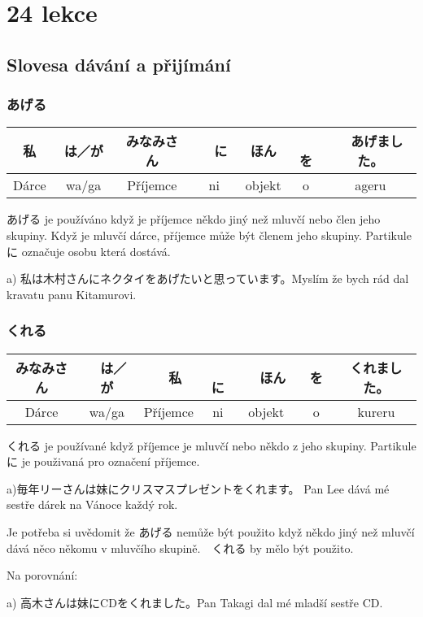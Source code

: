 \section{24 lekce}

\subsection{Slovesa dávání a přijímání}


\subsubsection{あげる}
\begin{tabular}{||c|c||c|c||c|c||c||}
\hline
私　&は／が　&みなみさん&　に　&ほん&　を&　あげました。\\
\hline
Dárce&wa/ga&Příjemce&ni&objekt&o&ageru\\
\hline
\end{tabular}


あげる je používáno když je příjemce někdo jiný než mluvčí nebo člen jeho skupiny. Když je mluvčí dárce, příjemce může být členem jeho skupiny. Partikule　に označuje osobu která dostává.

a) 私は木村さんにネクタイをあげたいと思っています。Myslím že bych rád dal kravatu panu Kitamurovi.


\subsubsection{くれる}
\begin{tabular}{||c|c||c|c||c|c||c||}
\hline
みなみさん&　は／が&　私&　に&　ほん　&を　&くれました。\\
\hline
Dárce&wa/ga&Příjemce&ni&objekt&o&kureru\\
\hline
\end{tabular}

 
くれる je používané když příjemce je mluvčí nebo někdo z jeho skupiny. Partikule　　に je použivaná pro označení příjemce.

a)毎年リーさんは妹にクリスマスプレゼントをくれます。 Pan Lee dává mé sestře dárek na Vánoce každý rok.


Je potřeba si uvědomit že あげる nemůže být použito když někdo jiný než mluvčí dává něco někomu v mluvčího skupině.　くれる by mělo být použito.


Na porovnání:

a) 高木さんは妹にCDをくれました。Pan Takagi dal mé mladší sestře CD.

